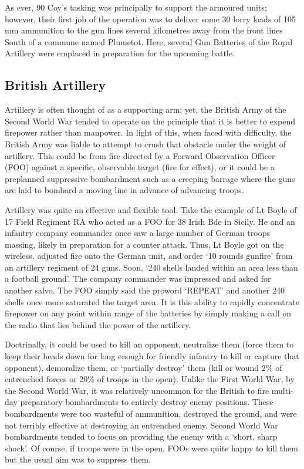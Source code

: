 \documentclass[noraggedright]{turabian-researchpaper}
\begin{document}
As ever, 90 Coy's tasking was principally to support the armoured units; however,
their first job of the operation was to deliver some 30 lorry loads of 105 mm
ammunition to the gun lines several kilometres away from the front lines South
of a commune named Plumetot.  Here, several Gun Batteries of the Royal Artillery
were emplaced in preparation for the upcoming battle. 

	\subsection{British Artillery} %

Artillery is often thought of as a supporting arm; yet, the British Army of the
Second World War tended to operate on the principle that it is better to expend 
firepower rather than manpower.  In light of this, when faced with difficulty,
the British Army was liable to attempt to crush that obstacle under the weight
of artillery.  This could be from fire directed by a Forward Observation 
Officer (FOO) against a specific, observable target (fire for effect), or it 
could be a preplanned suppressive bombardment such as a creeping barrage where 
the guns are laid to bombard a moving line in advance of advancing troops.

Artillery was quite an effective and flexible tool.  Take the example of 
Lt Boyle of 17 Field Regiment RA who acted as a FOO for 38 Irish Bde in 
Sicily.  He and an infantry company commander once saw a large number of German 
troops massing, likely in preparation for a counter attack.  Thus, Lt Boyle 
got on the wireless, adjusted fire onto the German unit, and order `10 
rounds gunfire' from an artillery regiment of 24 guns.  Soon, `240 shells
landed within an area less than a football ground'.\autocite[133]{gunfire}
The company commander was impressed and asked for another salvo.  The FOO
simply said the proword `REPEAT' and another 240 shells once more
saturated the target area.\autocite[133]{gunfire}  It is this ability to 
rapidly concentrate firepower on any point within range of the batteries
by simply making a call on the radio that lies behind the power of the
artillery.

Doctrinally, it could be used to kill an opponent,
neutralize them (force them to keep their heads down for long enough for 
friendly infantry to kill or capture that opponent), demoralize them, or 
`partially destroy' them (kill or wound 2\% of entrenched forces or 20\% of 
troops in the open).\autocite[133]{gunfire}  Unlike the First World War, by 
the Second World War, it was relatively uncommon for the British to fire
multi-day preparatory bombardments to entirely destroy enemy positions.  
These bombardments were too wasteful of ammunition, destroyed the ground, and
were not terribly effective at destroying an entrenched enemy.  
Second World War bombardments tended to focus on providing the enemy with a
`short, sharp shock'.  Of course, if troops were in the open, FOOs were quite 
happy to kill them but the usual aim was to suppress them.  
\end{document}
